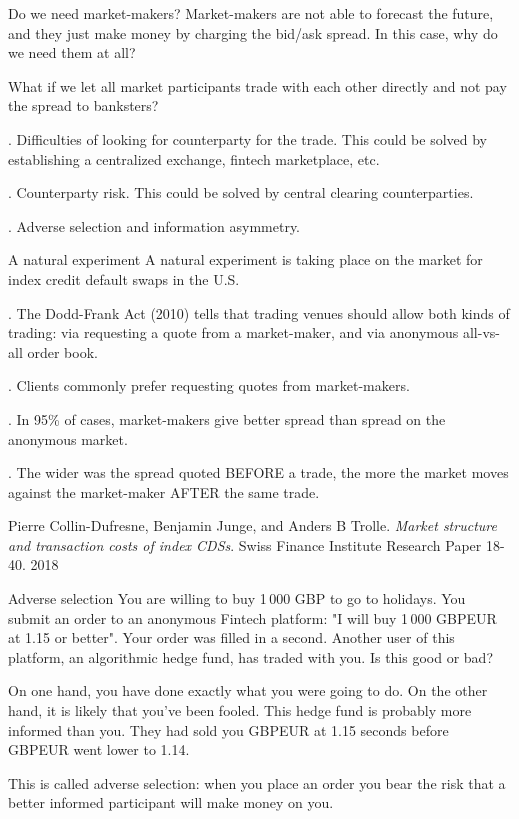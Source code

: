 \documentclass{beamer}
\begin{document}
\begin{frame}{Do we need market-makers?}
\justify
Market-makers are not able to forecast the future, and they just make money by charging the bid/ask spread. In this case, why do we need them at all?

\justify
What if we let all market participants trade with each other directly and not pay the spread to banksters?

. Difficulties of looking for counterparty for the trade. This could be solved by establishing a centralized exchange, fintech marketplace, etc.

. Counterparty risk. This could be solved by central clearing counterparties.

. Adverse selection and information asymmetry.
\end{frame}



\begin{frame}{A natural experiment}
\justify
A natural experiment is taking place on the market for index credit default swaps in the U.S.

. The Dodd-Frank Act (2010) tells that trading venues should allow both kinds of trading: via requesting a quote from a market-maker, and via anonymous all-vs-all order book.

. Clients commonly prefer requesting quotes from market-makers.

. In 95\% of cases, market-makers give better spread than spread on the anonymous market.

. The wider was the spread quoted BEFORE a trade, the more the market moves against the market-maker AFTER the same trade.

\justify
\small{Pierre Collin-Dufresne, Benjamin Junge, and Anders B Trolle. \textit{Market structure and transaction costs of index CDSs}. Swiss Finance Institute Research Paper 18-40. 2018}
\end{frame}


\begin{frame}{Adverse selection}
\justify
You are willing to buy 1\,000 GBP to go to holidays. You submit an order to an anonymous Fintech platform: "I will buy 1\,000 GBPEUR at 1.15 or better". Your order was filled in a second. Another user of this platform, an algorithmic hedge fund, has traded with you. Is this good or bad?

\justify
On one hand, you have done exactly what you were going to do. On the other hand, it is likely that you've been fooled. This hedge fund is probably more informed than you. They had sold you GBPEUR at 1.15 seconds before GBPEUR went lower to 1.14.

\justify
This is called \alert{adverse selection}: when you place an order you bear the risk that a better informed participant will make money on you.
\end{frame}
\end{document}
